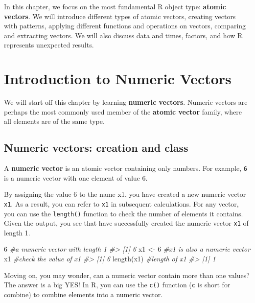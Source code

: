 \documentclass[
]{book}
\newenvironment{Shaded}{\begin{snugshade}}{\end{snugshade}}
\newcommand{\CommentTok}[1]{\textcolor[rgb]{0.56,0.35,0.01}{\textit{#1}}}
\newcommand{\DecValTok}[1]{\textcolor[rgb]{0.00,0.00,0.81}{#1}}
\newcommand{\FunctionTok}[1]{\textcolor[rgb]{0.00,0.00,0.00}{#1}}
\newcommand{\NormalTok}[1]{#1}
\newcommand{\OtherTok}[1]{\textcolor[rgb]{0.56,0.35,0.01}{#1}}
\begin{document}
In this chapter, we focus on the most fundamental R object type: \textbf{atomic vectors}. We will introduce different types of atomic vectors, creating vectors with patterns, applying different functions and operations on vectors, comparing and extracting vectors. We will also discuss data and times, factors, and how R represents unexpected results.

\hypertarget{intro-num-vector}{%
\section{Introduction to Numeric Vectors}\label{intro-num-vector}}

We will start off this chapter by learning \textbf{numeric vectors}. Numeric vectors are perhaps the most commonly used member of the \textbf{atomic vector} family, where all elements are of the same type.

\hypertarget{create-numeric-vector}{%
\subsection{Numeric vectors: creation and class}\label{create-numeric-vector}}

A \textbf{numeric vector} is an atomic vector containing only numbers. For example, \texttt{6} is a numeric vector with one element of value 6.

By assigning the value 6 to the name x1, you have created a new numeric vector \texttt{x1}. As a result, you can refer to \texttt{x1} in subsequent calculations. For any vector, you can use the \texttt{length()} function to check the number of elements it contains. Given the output, you see that have successfully created the numeric vector \texttt{x1} of length 1.

\begin{Shaded}
\begin{Highlighting}[]
\DecValTok{6}                         \CommentTok{\#a numeric vector with length 1}
\CommentTok{\#\textgreater{} [1] 6}
\NormalTok{x1 }\OtherTok{\textless{}{-}} \DecValTok{6}                   \CommentTok{\#x1 is also a numeric vector}
\NormalTok{x1                        }\CommentTok{\#check the value of x1}
\CommentTok{\#\textgreater{} [1] 6}
\FunctionTok{length}\NormalTok{(x1)                }\CommentTok{\#length of x1}
\CommentTok{\#\textgreater{} [1] 1}
\end{Highlighting}
\end{Shaded}

Moving on, you may wonder, can a numeric vector contain more than one values? The answer is a big YES! In R, you can use the \texttt{c()} function (\texttt{c} is short for combine) to combine elements into a numeric vector.
\end{document}
